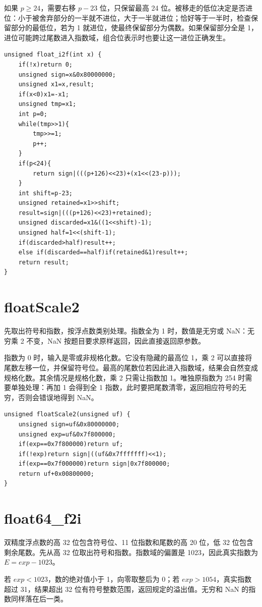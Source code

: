 \documentclass[12pt,a4paper]{ctexart}
\begin{document}
如果 $p\geq24$，需要右移 $p-23$ 位，只保留最高 24 位。被移走的低位决定是否进位：小于被舍弃部分的一半就不进位，大于一半就进位；恰好等于一半时，检查保留部分的最低位，若为 1 就进位，使最终保留部分为偶数。如果保留部分全是 1，进位可能跨过尾数进入指数域，组合位表示时也要让这一进位正确发生。

\begin{lstlisting}
unsigned float_i2f(int x) {
    if(!x)return 0;
    unsigned sign=x&0x80000000;
    unsigned x1=x,result;
    if(x<0)x1=-x1;
    unsigned tmp=x1;
    int p=0;
    while(tmp>>1){
        tmp>>=1;
        p++;
    }
    if(p<24){
        return sign|(((p+126)<<23)+(x1<<(23-p)));
    }
    int shift=p-23;
    unsigned retained=x1>>shift;
    result=sign|(((p+126)<<23)+retained);
    unsigned discarded=x1&((1<<shift)-1);
    unsigned half=1<<(shift-1);
    if(discarded>half)result++;
    else if(discarded==half)if(retained&1)result++;
    return result;
}
\end{lstlisting}

\section{floatScale2}
先取出符号和指数，按浮点数类别处理。指数全为 1 时，数值是无穷或 NaN：无穷乘 2 不变，NaN 按题目要求原样返回，因此直接返回原参数。

指数为 0 时，输入是零或非规格化数。它没有隐藏的最高位 1，乘 2 可以直接将尾数左移一位，并保留符号位。最高的尾数位若因此进入指数域，结果会自然变成规格化数。其余情况是规格化数，乘 2 只需让指数加 1。唯独原指数为 254 时需要单独处理：再加 1 会得到全 1 指数，此时要把尾数清零，返回相应符号的无穷，否则会错误地得到 NaN。

\begin{lstlisting}
unsigned floatScale2(unsigned uf) {
    unsigned sign=uf&0x80000000;
    unsigned exp=uf&0x7f800000;
    if(exp==0x7f800000)return uf;
    if(!exp)return sign|((uf&0x7fffffff)<<1);
    if(exp==0x7f000000)return sign|0x7f800000;
    return uf+0x00800000;
}
\end{lstlisting}

\section{float64\_f2i}
双精度浮点数的高 32 位包含符号位、11 位指数和尾数的高 20 位，低 32 位包含剩余尾数。先从高 32 位取出符号和指数。指数域的偏置是 1023，因此真实指数为 $E=exp-1023$。

若 $exp<1023$，数的绝对值小于 1，向零取整后为 0；若 $exp>1054$，真实指数超过 31，结果超出 32 位有符号整数范围，返回规定的溢出值。无穷和 NaN 的指数同样落在后一类。
\end{document}
